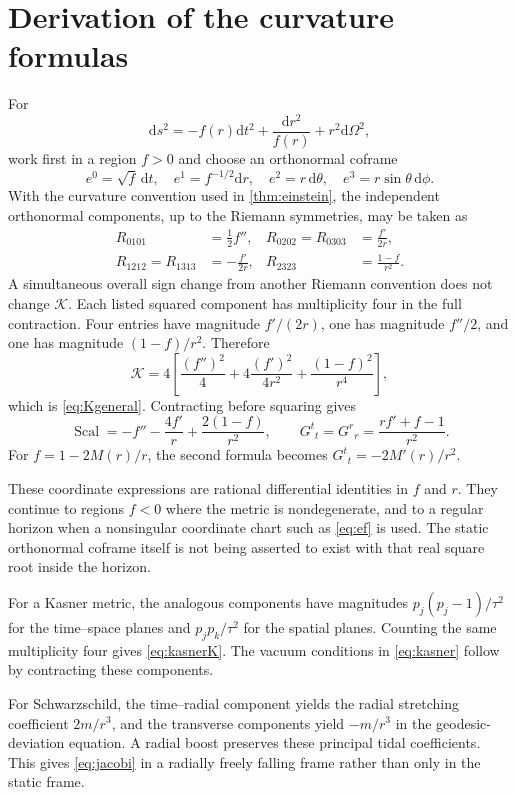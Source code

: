 \documentclass[11pt,a4paper]{article}
\numberwithin{equation}{section}
\theoremstyle{definition}
\theoremstyle{remark}
\newcommand{\Scal}{\operatorname{Scal}}
\newcommand{\Kret}{\mathcal K}
\newcommand{\dd}{\mathrm d}
\begin{document}
\section{Derivation of the curvature formulas}\label{app:curvature}

For
\[
\dd s^2=-f(r)\dd t^2+\frac{\dd r^2}{f(r)}+r^2\dd\Omega^2,
\]
work first in a region $f>0$ and choose an orthonormal coframe
\[
e^0=\sqrt f\,\dd t,\quad e^1=f^{-1/2}\dd r,\quad
 e^2=r\,\dd\theta,\quad e^3=r\sin\theta\,\dd\phi.
\]
With the curvature convention used in \cref{thm:einstein}, the independent
orthonormal components, up to the Riemann symmetries, may be taken as
\begin{align*}
R_{0101}&=\tfrac12 f'',&
R_{0202}=R_{0303}&=\frac{f'}{2r},\\
R_{1212}=R_{1313}&=-\frac{f'}{2r},&
R_{2323}&=\frac{1-f}{r^2}.
\end{align*}
A simultaneous overall sign change from another Riemann convention does not
change $\Kret$. Each listed squared component has multiplicity four in the
full contraction. Four entries have magnitude $f'/(2r)$, one has magnitude
$f''/2$, and one has magnitude $(1-f)/r^2$. Therefore
\[
\Kret=4\left[\frac{(f'')^2}{4}
          +4\frac{(f')^2}{4r^2}+\frac{(1-f)^2}{r^4}\right],
\]
which is \eqref{eq:Kgeneral}. Contracting before squaring gives
\begin{equation}\label{eq:Rgeneral}
\Scal=-f''-\frac{4f'}r+\frac{2(1-f)}{r^2},
\qquad G^t{}_t=G^r{}_r=\frac{rf'+f-1}{r^2}.
\end{equation}
For $f=1-2M(r)/r$, the second formula becomes
$G^t{}_t=-2M'(r)/r^2$.

These coordinate expressions are rational differential identities in $f$ and
$r$. They continue to regions $f<0$ where the metric is nondegenerate, and to a
regular horizon when a nonsingular coordinate chart such as
\eqref{eq:ef} is used. The static orthonormal coframe itself is not being
asserted to exist with that real square root inside the horizon.

For a Kasner metric, the analogous components have magnitudes
$p_j(p_j-1)/\tau^2$ for the time--space planes and $p_jp_k/\tau^2$ for the
spatial planes. Counting the same multiplicity four gives
\eqref{eq:kasnerK}. The vacuum conditions in \eqref{eq:kasner} follow by
contracting these components.

For Schwarzschild, the time--radial component yields the radial stretching
coefficient $2m/r^3$, and the transverse components yield $-m/r^3$ in the
geodesic-deviation equation. A radial boost preserves these principal tidal
coefficients. This gives \eqref{eq:jacobi} in a radially freely falling frame
rather than only in the static frame.
\end{document}
